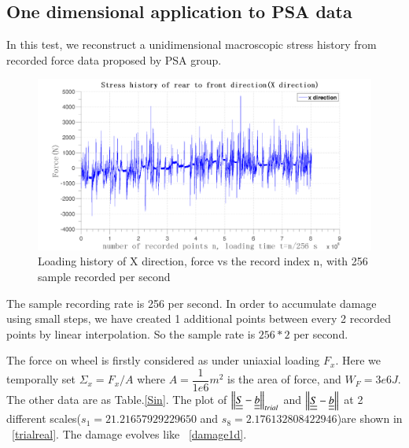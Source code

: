 \documentclass[3p,times,number,review]{elsarticle}
\newcommand{\figref}[1]{\figurename~\ref{#1}}
\begin{document}
\newpage
\subsection{One dimensional application to PSA data}
In this test, we reconstruct a unidimensional macroscopic stress history from recorded force data proposed by PSA group. 
\begin{figure}[!h]
	\centering
	\includegraphics[width=\textwidth]{figures//x.png} 
	\caption{Loading history of X direction, force vs the record index n, with 256 sample recorded per second}
	\label{x}
\end{figure}

The sample recording rate is 256 per second. In order to accumulate damage using small steps, we have created 1 additional points between every 2 recorded points by linear interpolation. So the sample rate is $256*2$ per second. 

The force on wheel is firstly considered as under uniaxial loading $F_x$. Here we temporally set $\Sigma_x=F_x/A$ where $A=\dfrac{1}{1e6} m^2$ is the area of force, and $W_F=3e6 J$. The other data are as Table.\ref{Sin}. The plot of $\left\|  \uline{\uline{S}}-\uline{\uline{b}}\right\|_{trial}$ and $\left\|  \uline{\uline{S}}-\uline{\uline{b}}\right\|$ at 2 different scales($s_1=21.21657929229650$ and $s_8=2.176132808422946$)are shown in \figref{trialreal}. The damage evolves like \figref{damage1d}.
\end{document}
